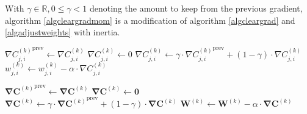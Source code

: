 \documentclass[titlepage]{article}
\begin{document}
        With $\gamma \in \mathbb{R}, 0 \leq \gamma < 1$ denoting the amount to
        keep from the previous gradient, algorithm \ref{algcleargradmom} is a
        modification of algorithm \ref{algcleargrad} and \ref{algadjustweights}
        with inertia.

        \begin{algorithm}
          \caption{%
            Modified version of algorithm \ref{algcleargrad} and
            \ref{algadjustweights} with inertia.
          } \label{algcleargradmom}
          \begin{algorithmic}
                    \State $
                      {\nabla C_{j,i}^{(k)}}^\text{prev} \gets
                        \nabla C_{j,i}^{(k)}
                    $
                    \State $\nabla C_{j,i}^{(k)} \gets 0$
                  \EndFor
                \EndFor
              \EndFor
            \EndProcedure
                    \State $
                      \nabla C_{j,i}^{(k)} \gets
                        \gamma \cdot {\nabla C_{j,i}^{(k)}}^\text{prev}
                        +
                        \left( 1 - \gamma \right) \cdot \nabla C_{j,i}^{(k)}
                    $
                    \State $
                      w_{j,i}^{(k)} \gets
                        w_{j,i}^{(k)} - \alpha \cdot \nabla C_{j,i}^{(k)}
                    $
                  \EndFor
                \EndFor
              \EndFor
            \EndProcedure
          \end{algorithmic}
        \end{algorithm}

        \begin{algorithm}
          \caption{%
            Algorithm \ref{algcleargradmom} with matrix-vector notation.
          }
          \begin{algorithmic}
                \State $
                  {\mathbf{\nabla C}^{(k)}}^\text{prev} \gets
                    \mathbf{\nabla C}^{(k)}
                $
                \State $\mathbf{\nabla C}^{(k)} \gets \mathbf{0}$
              \EndFor
            \EndProcedure
                \State $
                  \mathbf{\nabla C}^{(k)} \gets
                    \gamma \cdot {\mathbf{\nabla C}^{(k)}}^\text{prev}
                    + \left( 1 - \gamma \right) \cdot \mathbf{\nabla C}^{(k)}
                $
                \State $
                  \mathbf{W}^{(k)} \gets
                    \mathbf{W}^{(k)} - \alpha \cdot \mathbf{\nabla C}^{(k)}
                $
              \EndFor
            \EndProcedure
          \end{algorithmic}
        \end{algorithm}
\end{document}
